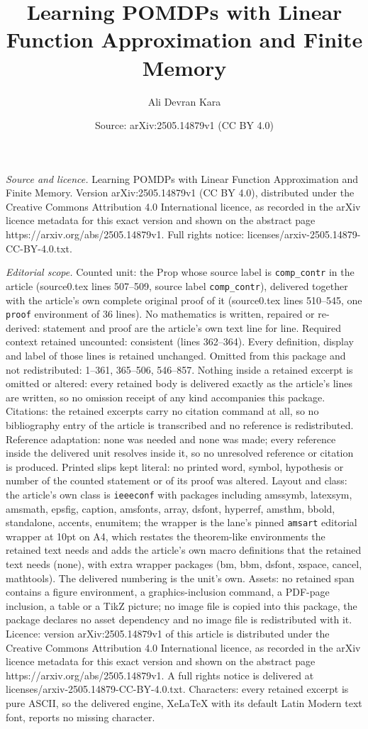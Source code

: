 \documentclass[10pt,a4paper]{amsart}
\title[Learning POMDPs with Linear Function Approximation and Finit]{Learning POMDPs with Linear Function Approximation and Finite Memory}
\author{Ali Devran Kara}
\date{Source: arXiv:2505.14879v1 (CC BY 4.0)}
\begin{document}
\maketitle

\noindent\emph{Source and licence.} Learning POMDPs with Linear Function Approximation and Finite Memory. Version arXiv:2505.14879v1 (CC BY 4.0), distributed under the Creative Commons Attribution 4.0 International licence, as recorded in the arXiv licence metadata for this exact version and shown on the abstract page https://arxiv.org/abs/2505.14879v1. Full rights notice: licenses/arxiv-2505.14879-CC-BY-4.0.txt.\par\smallskip

\noindent\textit{Editorial scope.} Counted unit: the Prop whose source label is \texttt{comp\_contr} in the article (source0.tex lines 507--509, source label \texttt{comp\_contr}), delivered together with the article's own complete original proof of it (source0.tex lines 510--545, one \texttt{proof} environment of 36 lines). No mathematics is written, repaired or re-derived: statement and proof are the article's own text line for line. Required context retained uncounted: consistent (lines 362--364). Every definition, display and label of those lines is retained unchanged. Omitted from this package and not redistributed: 1--361, 365--506, 546--857. Nothing inside a retained excerpt is omitted or altered: every retained body is delivered exactly as the article's lines are written, so no omission receipt of any kind accompanies this package. Citations: the retained excerpts carry no citation command at all, so no bibliography entry of the article is transcribed and no reference is redistributed. Reference adaptation: none was needed and none was made; every reference inside the delivered unit resolves inside it, so no unresolved reference or citation is produced. Printed slips kept literal: no printed word, symbol, hypothesis or number of the counted statement or of its proof was altered. Layout and class: the article's own class is \texttt{ieeeconf} with packages including amssymb, latexsym, amsmath, epsfig, caption, amsfonts, array, dsfont, hyperref, amsthm, bbold, standalone, accents, enumitem; the wrapper is the lane's pinned \texttt{amsart} editorial wrapper at 10pt on A4, which restates the theorem-like environments the retained text needs and adds the article's own macro definitions that the retained text needs (none), with extra wrapper packages (bm, bbm, dsfont, xspace, cancel, mathtools). The delivered numbering is the unit's own. Assets: no retained span contains a figure environment, a graphics-inclusion command, a PDF-page inclusion, a table or a TikZ picture; no image file is copied into this package, the package declares no asset dependency and no image file is redistributed with it. Licence: version arXiv:2505.14879v1 of this article is distributed under the Creative Commons Attribution 4.0 International licence, as recorded in the arXiv licence metadata for this exact version and shown on the abstract page https://arxiv.org/abs/2505.14879v1. A full rights notice is delivered at licenses/arxiv-2505.14879-CC-BY-4.0.txt. Characters: every retained excerpt is pure ASCII, so the delivered engine, XeLaTeX with its default Latin Modern text font, reports no missing character.
\end{document}
